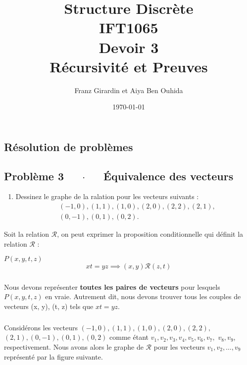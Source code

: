 \documentclass[16pt]{report}
\title{\Huge{Structure Discrète}\\{IFT1065}\\{\textbf{Devoir 3}} \\ {Récursivité et Preuves}}
\author{\huge{Franz Girardin et Aiya Ben Ouhida}}
\date{\today}
\begin{document}
\maketitle

\pagebreak
\begin{multicols*}{2}
\newcommand\scalemath[2]{\scalebox{#1}{\mbox{\ensuremath{\displaystyle #2}}}}

    \chapter{Résolution de problèmes}

    \section*{Problème 3 $\quad$ $\cdot$  $\quad$ Équivalence des vecteurs}
            \begin{enumerate}
                \item Dessinez le graphe de la ralation pour les vecteurs suivants : 
                \vspace{-0.5em}
                \begin{align*}
                        &(-1, 0), (1, 1), (1, 0), (2, 0), (2, 2), (2, 1),  \\ 
                        &(0, -1), (0, 1), (0, 2). 
                \end{align*}
            \end{enumerate}
            Soit la relation $\mathcal{R}$, on peut exprimer 
            la proposition conditionnelle qui définit la relation $\mathcal{R}$ :  

            \begin{prop}{$P(x, y, t, z)$}{}
                \[xt = yz \implies (x, y) \mathcal{R} (z, t) \]
            \end{prop}

            \paragraph{}
            Nous devons représenter \textbf{toutes les paires de vecteurs} pour lesquels 
            $P(x, y, t, z)$ en vraie. Autrement dit, nous devons trouver tous les couples de vecteurs 
            (x, y), (t, z) tels que $xt = yz$. 

            \paragraph{}
            Considérons les vecteurs                     
            $(-1, 0), (1, 1), (1, 0), (2, 0), (2, 2),$ 
            $(2, 1), (0, -1), (0, 1), (0, 2)$ comme étant 
            $v_1, v_2, v_3, v_4, v_5, v_6, v_7,$ $v_8, v_9$, 
            respectivement. Nous avons alors le graphe de $\mathcal{R}$ pour les 
            vecteurs $v_1, v_2,\dots, v_9$ représenté par la figure suivante. 



\end{multicols*}
\end{document}
